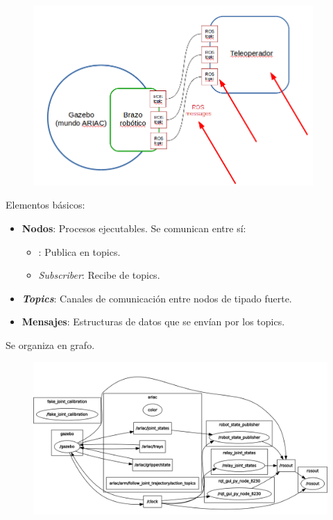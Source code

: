 \documentclass[notes,slidesec,a4]{seminar}
\begin{document}
\begin{hslide}
	\begin{center}
		\begin{figure}
			\includegraphics[width=0.95\textwidth]{graficobrazo.png}
		\end{figure}
	\end{center}
\end{hslide}

\begin{hslide}
	Elementos básicos:
	\begin{itemize}
		\item \textbf{Nodos}: Procesos ejecutables. Se comunican entre sí:
		\begin{itemize}
			\item \textbf{}: Publica en topics.
			\item \textit{Subscriber}: Recibe de topics.
		\end{itemize}
		\item \textbf{\textit{Topics}}: Canales de comunicación entre nodos de tipado fuerte. 
		\item \textbf{Mensajes}: Estructuras de datos que se envían por los topics.
	\end{itemize}
	Se organiza en grafo.
\end{hslide}


\begin{hslide}
	\begin{center}
		\begin{figure}
			\includegraphics[width=\textwidth]{Brazo10.png}
		\end{figure}
	\end{center}
\end{hslide}
\end{document}

